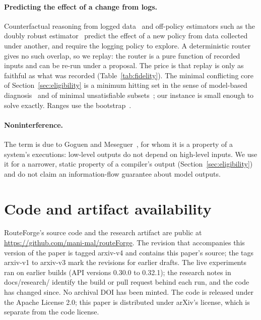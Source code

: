 \documentclass[11pt]{article}
\newcommand{\ubreak}{\textunderscore\allowbreak}
\newcommand{\code}[1]{{\ttfamily\let\_\ubreak #1}}
\newcommand{\repourl}{\url{https://github.com/mani-mal/routeForge}}
\begin{document}
\paragraph{Predicting the effect of a change from logs.} Counterfactual reasoning from logged
data~\cite{bottou} and off-policy estimators such as the doubly robust estimator~\cite{dudik}
predict the effect of a new policy from data collected under another, and require the logging
policy to explore. A deterministic router gives no such overlap, so we replay: the router is a
pure function of recorded inputs and can be re-run under a proposal. The price is that replay is
only as faithful as what was recorded (Table~\ref{tab:fidelity}). The minimal conflicting core of
Section~\ref{sec:eligibility} is a minimum hitting set in the sense of model-based
diagnosis~\cite{reiter} and of minimal unsatisfiable subsets~\cite{liffiton}; our instance is
small enough to solve exactly. Ranges use the bootstrap~\cite{efron}.

\paragraph{Noninterference.} The term is due to Goguen and Meseguer~\cite{goguen}, for whom it is
a property of a system's executions: low-level outputs do not depend on high-level inputs. We use
it for a narrower, static property of a compiler's output (Section~\ref{sec:eligibility}) and do
not claim an information-flow guarantee about model outputs.

\section{Code and artifact availability}
\label{sec:artifact}

RouteForge's source code and the research artifact are public at \repourl. The revision that
accompanies this version of the paper is tagged \code{arxiv-v4} and contains this paper's source;
the tags \code{arxiv-v1} to \code{arxiv-v3} mark the revisions for earlier drafts. The live experiments ran on
earlier builds (API versions 0.30.0 to 0.32.1); the research notes in \code{docs/research/}
identify the build or pull request behind each run, and the code has changed since. No archival
DOI has been minted. The code is released under the Apache License 2.0; this paper is
distributed under arXiv's license, which is separate from the code license.
\end{document}
